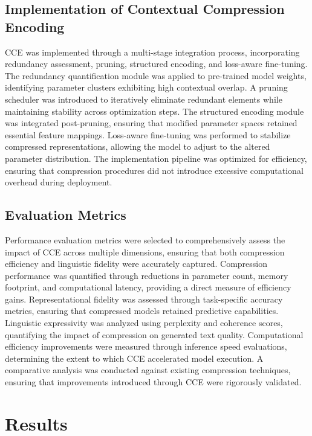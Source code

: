 \documentclass{article}
\begin{document}
\subsection{Implementation of Contextual Compression Encoding}

CCE was implemented through a multi-stage integration process, incorporating redundancy assessment, pruning, structured encoding, and loss-aware fine-tuning. The redundancy quantification module was applied to pre-trained model weights, identifying parameter clusters exhibiting high contextual overlap. A pruning scheduler was introduced to iteratively eliminate redundant elements while maintaining stability across optimization steps. The structured encoding module was integrated post-pruning, ensuring that modified parameter spaces retained essential feature mappings. Loss-aware fine-tuning was performed to stabilize compressed representations, allowing the model to adjust to the altered parameter distribution. The implementation pipeline was optimized for efficiency, ensuring that compression procedures did not introduce excessive computational overhead during deployment. 

\subsection{Evaluation Metrics}

Performance evaluation metrics were selected to comprehensively assess the impact of CCE across multiple dimensions, ensuring that both compression efficiency and linguistic fidelity were accurately captured. Compression performance was quantified through reductions in parameter count, memory footprint, and computational latency, providing a direct measure of efficiency gains. Representational fidelity was assessed through task-specific accuracy metrics, ensuring that compressed models retained predictive capabilities. Linguistic expressivity was analyzed using perplexity and coherence scores, quantifying the impact of compression on generated text quality. Computational efficiency improvements were measured through inference speed evaluations, determining the extent to which CCE accelerated model execution. A comparative analysis was conducted against existing compression techniques, ensuring that improvements introduced through CCE were rigorously validated.  




\section{Results}
\end{document}
